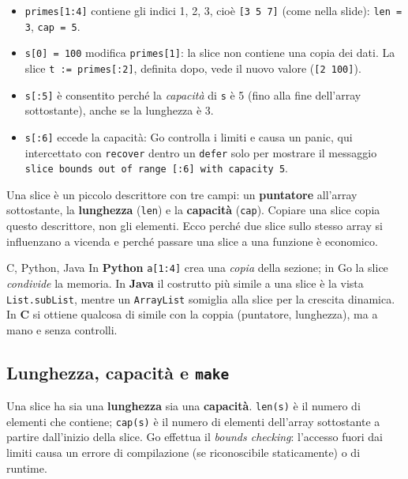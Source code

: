 \documentclass[11pt,a4paper]{report}
\newcommand{\cod}[1]{\texttt{#1}}
\begin{document}
\begin{itemize}
  \item \cod{primes[1:4]} contiene gli indici 1, 2, 3, cioè \cod{[3 5 7]}
        (come nella slide): \cod{len = 3}, \cod{cap = 5}.
  \item \cod{s[0] = 100} modifica \cod{primes[1]}: la slice non contiene una
        copia dei dati. La slice \cod{t := primes[:2]}, definita dopo,
        vede il nuovo valore (\cod{[2 100]}).
  \item \cod{s[:5]} è consentito perché la \emph{capacità} di \cod{s} è 5
        (fino alla fine dell'array sottostante), anche se la lunghezza è 3.
  \item \cod{s[:6]} eccede la capacità: Go controlla i limiti e causa un
        panic, qui intercettato con \cod{recover} dentro un \cod{defer}
        solo per mostrare il messaggio
        \texttt{slice bounds out of range [:6] with capacity 5}.
\end{itemize}

\begin{nota}
Una slice è un piccolo descrittore con tre campi: un \textbf{puntatore}
all'array sottostante, la \textbf{lunghezza} (\cod{len}) e la \textbf{capacità}
(\cod{cap}). Copiare una slice copia questo descrittore, non gli elementi. Ecco
perché due slice sullo stesso array si influenzano a vicenda e perché passare una
slice a una funzione è economico.
\end{nota}

\begin{confronto}{C, Python, Java}
In \textbf{Python} \cod{a[1:4]} crea una \emph{copia} della sezione; in Go la
slice \emph{condivide} la memoria. In \textbf{Java} il costrutto più simile a
una slice è la vista \cod{List.subList}, mentre un \cod{ArrayList} somiglia alla
slice per la crescita dinamica. In \textbf{C} si ottiene qualcosa di simile con la
coppia (puntatore, lunghezza), ma a mano e senza controlli.
\end{confronto}

\subsection{Lunghezza, capacità e \texttt{make}}

Una slice ha sia una \textbf{lunghezza} sia una \textbf{capacità}.
\cod{len(s)} è il numero di elementi che contiene; \cod{cap(s)} è il numero di
elementi dell'array sottostante a partire dall'inizio della slice. Go
effettua il \emph{bounds checking}: l'accesso fuori dai limiti causa un errore di
compilazione (se riconoscibile staticamente) o di runtime.
\end{document}
